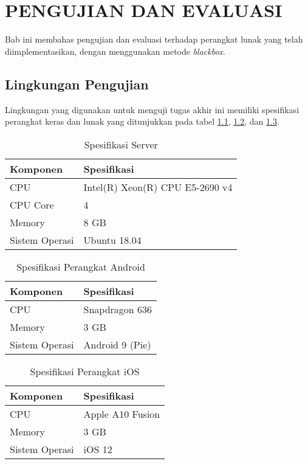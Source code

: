 \chapter{PENGUJIAN DAN EVALUASI}
\par Bab ini membahas pengujian dan evaluasi terhadap perangkat lunak yang telah diimplementasikan, dengan menggunakan metode \textit{blackbox}.

\section{Lingkungan Pengujian}
\par Lingkungan yang digunakan untuk menguji tugas akhir ini memiliki spesifikasi perangkat keras dan lunak yang ditunjukkan pada tabel \ref{5:tabel_spesifikasi_server}, \ref{5:tabel_spesifikasi_perangkat_android}, dan \ref{5:tabel_spesifikasi_perangkat_ios}.
\begin{longtable}{|p{3cm}|p{6.5cm}|}
	\caption{Spesifikasi Server} \label{5:tabel_spesifikasi_server} \\ \hline
    \rowcolor{lightgray} Komponen & Spesifikasi \\ \hline
    CPU & Intel(R) Xeon(R) CPU E5-2690 v4 \\ \hline
    CPU Core & 4 \\ \hline
    Memory & 8 GB \\ \hline
    Sistem Operasi & Ubuntu 18.04 \\ \hline
\end{longtable}
\begin{longtable}{|p{3cm}|p{6.5cm}|}
	\caption{Spesifikasi Perangkat Android} \label{5:tabel_spesifikasi_perangkat_android} \\ \hline
	\rowcolor{lightgray} Komponen & Spesifikasi \\ \hline
    CPU & Snapdragon 636 \\ \hline
    Memory & 3 GB \\ \hline
    Sistem Operasi & Android 9 (Pie) \\ \hline
\end{longtable}
\begin{longtable}{|p{3cm}|p{6.5cm}|}
	\caption{Spesifikasi Perangkat iOS} \label{5:tabel_spesifikasi_perangkat_ios} \\ \hline
	\rowcolor{lightgray} Komponen & Spesifikasi \\ \hline
    CPU & Apple A10 Fusion \\ \hline
    Memory & 3 GB \\ \hline
    Sistem Operasi & iOS 12 \\ \hline
\end{longtable}

